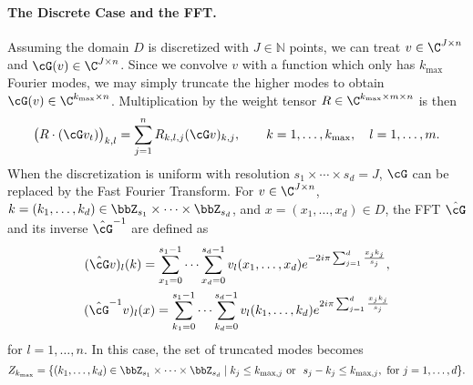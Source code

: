 \paragraph{The Discrete Case and the FFT.}
Assuming the domain $D$ is discretized with $J \in \mathbb{N}$ points, we can treat $v \in \C^{J \times n}$ and $\cG (v) \in \C^{J \times n}$.
Since we convolve $v$ with a function which only has $k_{\text{max}}$ Fourier modes, we may simply truncate the higher modes to obtain $\cG (v) \in \C^{k_{\text{max}} \times n}$. Multiplication by the weight tensor $R \in \C^{k_{\text{max}} \times m \times n}$ is then
\begin{equation}
\label{eq:fft_mult}
\bigl( R \cdot (\cG v_t) \bigr)_{k,l} = \sum_{j=1}^{n} R_{k,l,j}  (\cG v)_{k,j}, \qquad k=1,\dots,k_{\text{max}}, \quad l=1,\dots,m.
\end{equation}
When the discretization is uniform with resolution \(s_1 \times  \cdots \times s_d = J\), $\cG$ can be replaced by the Fast Fourier Transform. For $v \in \C^{J \times n}$,   $k = (k_1, \ldots, k_{d}) \in \bbZ_{s_1} \times \cdots \times \bbZ_{s_d}$, and $x=(x_1, \ldots, x_{d}) \in D$, the FFT $\hat{\cG}$ and its inverse $\hat{\cG}^{-1}$ are defined as
\begin{align*}
    (\hat{\cG} v)_l(k) = \sum_{x_1=0}^{s_1-1} \cdots \sum_{x_{d}=0}^{s_d-1} v_l(x_1, \ldots, x_{d}) e^{- 2i \pi \sum_{j=1}^{d} \frac{x_j k_j}{s_j} }, \\
    (\hat{\cG}^{-1} v)_l(x) = \sum_{k_1=0}^{s_1-1} \cdots \sum_{k_{d}=0}^{s_d-1} v_l(k_1, \ldots, k_{d}) e^{2i \pi \sum_{j=1}^{d} \frac{x_j k_j}{s_j} }
\end{align*}
for $l=1,\dots,n$. 
In this case, the set of truncated modes becomes
\[Z_{k_{\text{max}}} = \{(k_1, \ldots, k_{d}) \in \bbZ_{s_1} \times \cdots \times \bbZ_{s_d} \mid k_j \leq k_{\text{max},j} \text{ or }\ s_j-k_j \leq k_{\text{max},j}, \text{ for } j=1,\dots,d\}.\]
